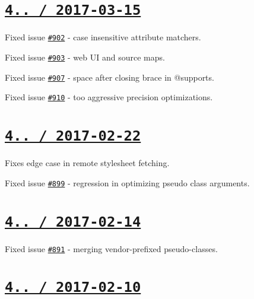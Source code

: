 \section*{\href{https://github.com/jakubpawlowicz/clean-css/compare/v4.0.8...v4.0.9}{\tt 4.. / 2017-\/03-\/15} }


\begin{DoxyItemize}
\item Fixed issue \href{https://github.com/jakubpawlowicz/clean-css/issues/902}{\tt \#902} -\/ case insensitive attribute matchers.
\item Fixed issue \href{https://github.com/jakubpawlowicz/clean-css/issues/903}{\tt \#903} -\/ web UI and source maps.
\item Fixed issue \href{https://github.com/jakubpawlowicz/clean-css/issues/907}{\tt \#907} -\/ space after closing brace in {\ttfamily @supports}.
\item Fixed issue \href{https://github.com/jakubpawlowicz/clean-css/issues/910}{\tt \#910} -\/ too aggressive precision optimizations.
\end{DoxyItemize}

\section*{\href{https://github.com/jakubpawlowicz/clean-css/compare/v4.0.7...v4.0.8}{\tt 4.. / 2017-\/02-\/22} }


\begin{DoxyItemize}
\item Fixes edge case in remote stylesheet fetching.
\item Fixed issue \href{https://github.com/jakubpawlowicz/clean-css/issues/899}{\tt \#899} -\/ regression in optimizing pseudo class arguments.
\end{DoxyItemize}

\section*{\href{https://github.com/jakubpawlowicz/clean-css/compare/v4.0.6...v4.0.7}{\tt 4.. / 2017-\/02-\/14} }


\begin{DoxyItemize}
\item Fixed issue \href{https://github.com/jakubpawlowicz/clean-css/issues/891}{\tt \#891} -\/ merging vendor-\/prefixed pseudo-\/classes.
\end{DoxyItemize}

\section*{\href{https://github.com/jakubpawlowicz/clean-css/compare/v4.0.5...v4.0.6}{\tt 4.. / 2017-\/02-\/10} }


